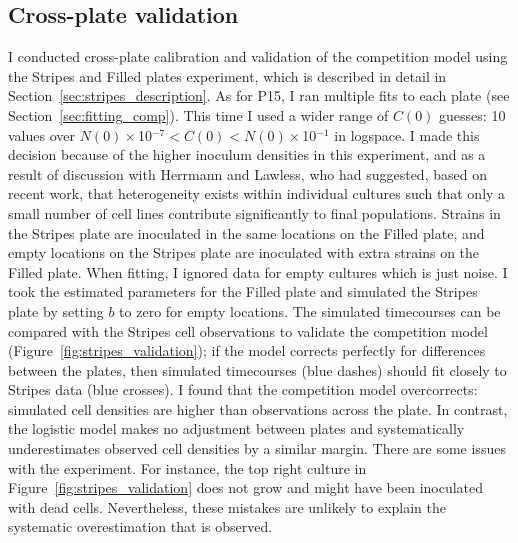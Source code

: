\begin{multicols}{2}
\subsection{Cross-plate validation}
\label{sec:cross_plate_val_results}

I conducted cross-plate calibration and validation of the
competition model using the Stripes and Filled plates experiment,
which is described in detail in
Section~\ref{sec:stripes_description}.
%
As for P15, I ran multiple fits to each plate (see
Section~\ref{sec:fitting_comp}). This time I used a wider range of
\(C(0)\) guesses: 10 values over
\(N(0)\times\)10\(^{-7} < C(0) < N(0)\times\)10\(^{-1}\) in
logspace. I made this decision because of the higher inoculum
densities in this experiment, and as a result of discussion with
Herrmann and Lawless, who had suggested, based on recent work, that
heterogeneity exists within individual cultures such that only a small
number of cell lines contribute significantly to final
populations. Strains in the Stripes plate are inoculated in the same
locations on the Filled plate, and empty locations on the Stripes
plate are inoculated with extra strains on the Filled plate. When
fitting, I ignored data for empty cultures which is just noise. I took
the estimated parameters for the Filled plate and simulated the
Stripes plate by setting \(b\) to zero for empty locations. The
simulated timecourses can be compared with the Stripes cell
observations to validate the competition model
(Figure~\ref{fig:stripes_validation}); if the model corrects perfectly
for differences between the plates, then simulated timecourses (blue
dashes) should fit closely to Stripes data (blue crosses). I found
that the competition model overcorrects: simulated cell densities are
higher than observations across the plate. In contrast, the logistic
model makes no adjustment between plates and systematically
underestimates observed cell densities by a similar margin.
There are some issues with the experiment. For instance, the top right
culture in Figure~\ref{fig:stripes_validation} does not grow and might
have been inoculated with dead cells. Nevertheless, these mistakes are
unlikely to explain the systematic overestimation that is observed.

\end{multicols}
\graphicspath{{images/stripes/}}
